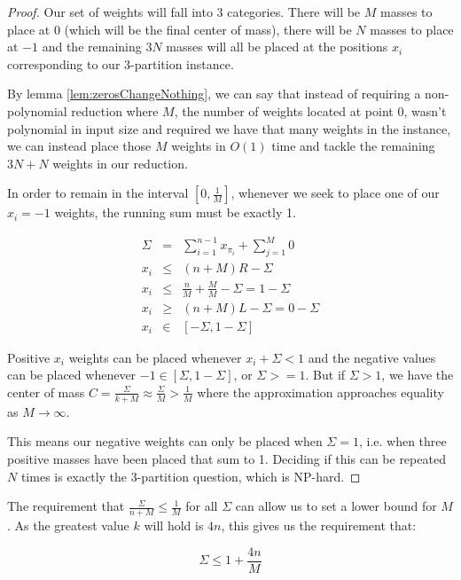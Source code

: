 \begin{proof}
Our set of weights will fall into 3 categories.  There will be $M$ masses to place at 0 (which will be the final center of mass), there will be $N$ masses to place at $-1$ and the remaining $3N$ masses will all be placed at the positions $x_i$ corresponding to our 3-partition instance.

By lemma \ref{lem:zerosChangeNothing}, we can say that instead of requiring a non-polynomial reduction where $M$, the number of weights located at point 0, wasn't polynomial in input size and required we have that many weights in the instance, we can instead place those $M$ weights in $ O(1) $ time and tackle the remaining $ 3N + N$ weights in our reduction.

In order to remain in the interval $[0, \frac{1}{M}]$, whenever we seek to place one of our $x_i = -1$ weights, the running sum must be exactly 1.

\begin{eqnarray*}
\Sigma &=& \sum_{i=1}^{n-1} x_{\pi_i} + \sum_{j=1}^M 0 \\
x_i &\leq& (n+M) R - \Sigma \\
x_i &\leq& \frac{n}{M} + \frac{M}{M}- \Sigma = 1 - \Sigma \\
x_i &\geq& (n+M) L - \Sigma = 0 - \Sigma \\
x_i &\in& [ - \Sigma, 1 - \Sigma ]
\end{eqnarray*}

Positive $x_i$ weights can be placed whenever $x_i + \Sigma < 1$ and the negative values can be placed whenever $ -1 \in [\Sigma, 1-\Sigma] $, or $ \Sigma >= 1$.  But if $ \Sigma > 1$, we have the center of mass $ C = \frac{\Sigma}{k+M} \approx \frac{\Sigma}{M} > \frac{1}{M}$ where the approximation approaches equality as $ M \rightarrow \infty$.

This means our negative weights can only be placed when $\Sigma = 1$, i.e. when three positive masses have been placed that sum to 1.  Deciding if this can be repeated $N$ times is exactly the 3-partition question, which is NP-hard.
\end{proof}

The requirement that $\frac{\Sigma}{n+M} \leq \frac{1}{M}$ for all $\Sigma$ can allow us to set a lower bound for $M$.  As the greatest value $k$ will hold is $4n$, this gives us the requirement that:

\begin{equation*}
\Sigma \leq 1 + \frac{4n}{M}
\end{equation*}

